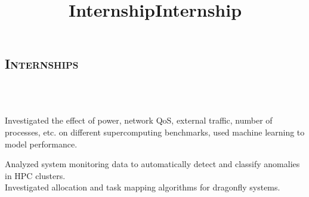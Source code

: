 \begin{resume}
	\section{\textsc{Internships}}

	\begin{formatb}
		\\
		\body\\
	\end{formatb}

	\title{Internship}
	\begin{position}
    Investigated the effect of power, network QoS, external traffic, number of
    processes, etc. on different supercomputing benchmarks, used machine
    learning to model performance.
	\end{position}

\vspace{0.1in}
	\title{Internship}
	\begin{position}
		Analyzed system monitoring data to automatically detect and classify
    anomalies in HPC clusters. \\
    Investigated allocation and task mapping algorithms for dragonfly systems.
	\end{position}




\end{resume}
